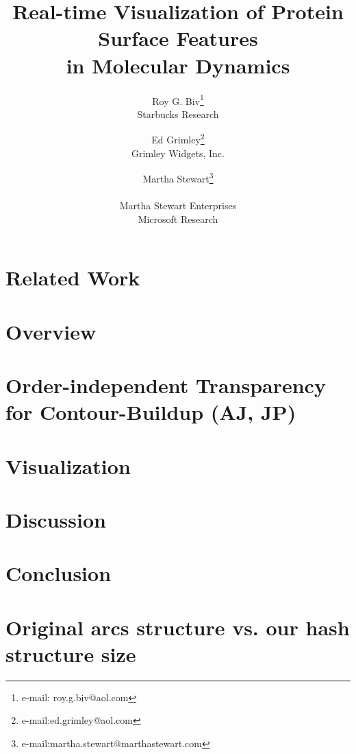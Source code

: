 \documentclass[review]{vgtc}                 %
\title{Real-time Visualization of Protein Surface Features\\in Molecular Dynamics}
\author{Roy G. Biv\thanks{e-mail: roy.g.biv@aol.com}\\ %
        \scriptsize Starbucks Research %
\and Ed Grimley\thanks{e-mail:ed.grimley@aol.com}\\ %
     \scriptsize Grimley Widgets, Inc. %
\and Martha Stewart\thanks{e-mail:martha.stewart@marthastewart.com}\\ %
     \parbox{1.4in}{\scriptsize \centering Martha Stewart Enterprises \\ Microsoft Research}}
\begin{document}


\maketitle



\section{Related Work}


\section{Overview}


\section{Order-independent Transparency for Contour-Buildup (AJ, JP)}


\section{Visualization}


\section{Discussion}


\section{Conclusion}






\appendix
\section{Original arcs structure vs. our hash structure size}

\end{document}
